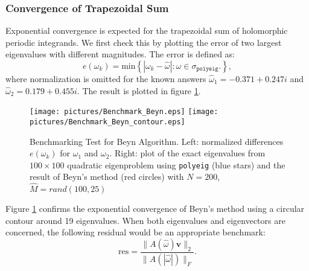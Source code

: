\documentclass[final,leqno,onefignum,onetabnum]{siamltex1213}
\begin{document}
\subsubsection{Convergence of Trapezoidal Sum}
Exponential convergence is expected for the trapezoidal sum of holomorphic periodic integrands. We first check this by plotting the error of two largest eigenvalues with different magnitudes. The error is defined as: 
\begin{equation}
\label{eq:e}
e(\omega_k) = \mathrm{min}\left\lbrace  |\omega_k - \hat{\omega}|:\hat{\omega}\in\sigma_{\mathtt{polyeig}}.\right\rbrace ,
\end{equation}
where normalization is omitted for the known answers  $\hat{\omega}_1 = -0.371 + 0.247i$ and $\hat{\omega}_2=
  0.179 + 0.455i$. The result is plotted in figure \ref{fig:Benchmark_Beyn}. 
\begin{figure}\label{fig:Benchmark_Beyn}
\begin{center}
\texttt{[image: pictures/Benchmark\_Beyn.eps]}
\texttt{[image: pictures/Benchmark\_Beyn\_contour.eps]}
\end{center}
\caption{Benchmarking Test for Beyn Algorithm. \textnormal{Left: normalized differences $e(\omega_k)$ for $\omega_1$ and $\omega_2$. Right: plot of the exact eigenvalues from $100\times100$ quadratic eigenproblem using {\tt polyeig} (blue stars) and the result of Beyn's method (red circles) with $N=200$, $\hat{M}=rand(100,25)$}}
\end{figure}
Figure \ref{fig:Benchmark_Beyn} confirms the exponential convergence of Beyn's method using a circular contour around 19 eigenvalues. When both eigenvalues and eigenvectors are concerned, the following residual would be an appropriate benchmark:
\begin{equation}
\label{eq:Residual}
\mathrm{res}=\frac{\| A(\hat{\omega})\mathbf{\hat{v}} \|_2 }{\|A(|\hat{\omega}|) \|_F}.
\end{equation}

\end{document}
